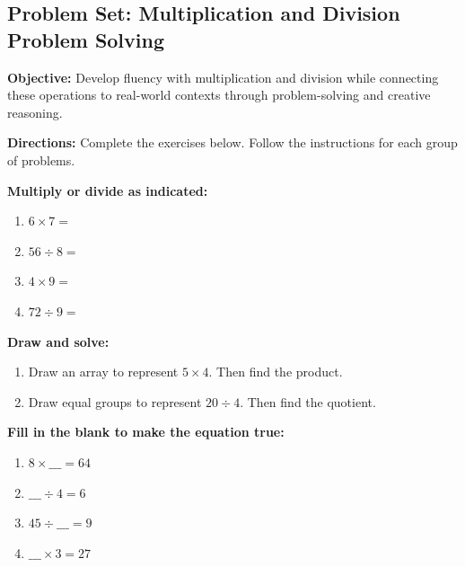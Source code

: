 \documentclass[12pt]{article}
\title{}
\date{}
\begin{document}
\subsection*{Problem Set: Multiplication and Division Problem Solving}
\onehalfspacing

\begin{tcolorbox}[colframe=black!40, colback=gray!5, 
coltitle=black, colbacktitle=black!20, fonttitle=\bfseries\Large, 
title=Learning Objective, halign title=center, left=5pt, right=5pt, top=5pt, bottom=15pt]
\textbf{Objective:} Develop fluency with multiplication and division while connecting these operations to real-world contexts through problem-solving and creative reasoning.
\end{tcolorbox}

\begin{tcolorbox}[colframe=black!60, colback=white, 
coltitle=black, colbacktitle=black!15, fonttitle=\bfseries\Large, 
title=Exercises, halign title=center, left=10pt, right=10pt, top=10pt, bottom=30pt]
\textbf{Directions:} Complete the exercises below. Follow the instructions for each group of problems.

\textbf{Multiply or divide as indicated:}
\begin{multicols}{2}
\begin{enumerate}[itemsep=.25em]
    \item  \(6 \times 7 = \)
    \item  \(56 \div 8 = \)
    \item \(4 \times 9 = \)
    \item  \(72 \div 9 = \)
\end{enumerate}
\end{multicols}

\textbf{Draw and solve:}
\begin{enumerate}[start=5, itemsep=6em]
    \item Draw an array to represent \(5 \times 4\). Then find the product.
    \item Draw equal groups to represent \(20 \div 4\). Then find the quotient.
    \vspace{6em}
\end{enumerate}

\textbf{Fill in the blank to make the equation true:}
\begin{enumerate}[resume, itemsep=1em]
    \item \(8 \times \_\_\_ = 64\)
    \item \(\_\_\_ \div 4 = 6\)
    \item \(45 \div \_\_\_ = 9\)
    \item \(\_\_\_ \times 3 = 27\)
\end{enumerate}
\end{tcolorbox}
\end{document}
